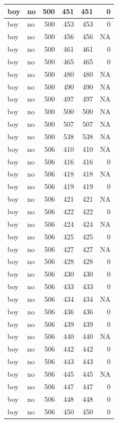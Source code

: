 \documentclass[man]{apa6}
\begin{document}
\begin{tabular}{l|l|r|r|r|r}
\hline
boy & no & 500 & 451 & 451 & 0\\
\hline
boy & no & 500 & 453 & 453 & 0\\
\hline
boy & no & 500 & 456 & 456 & NA\\
\hline
boy & no & 500 & 461 & 461 & 0\\
\hline
boy & no & 500 & 465 & 465 & 0\\
\hline
boy & no & 500 & 480 & 480 & NA\\
\hline
boy & no & 500 & 490 & 490 & NA\\
\hline
boy & no & 500 & 497 & 497 & NA\\
\hline
boy & no & 500 & 500 & 500 & NA\\
\hline
boy & no & 500 & 507 & 507 & NA\\
\hline
boy & no & 500 & 538 & 538 & NA\\
\hline
boy & no & 506 & 410 & 410 & NA\\
\hline
boy & no & 506 & 416 & 416 & 0\\
\hline
boy & no & 506 & 418 & 418 & NA\\
\hline
boy & no & 506 & 419 & 419 & 0\\
\hline
boy & no & 506 & 421 & 421 & NA\\
\hline
boy & no & 506 & 422 & 422 & 0\\
\hline
boy & no & 506 & 424 & 424 & NA\\
\hline
boy & no & 506 & 425 & 425 & 0\\
\hline
boy & no & 506 & 427 & 427 & NA\\
\hline
boy & no & 506 & 428 & 428 & 0\\
\hline
boy & no & 506 & 430 & 430 & 0\\
\hline
boy & no & 506 & 433 & 433 & 0\\
\hline
boy & no & 506 & 434 & 434 & NA\\
\hline
boy & no & 506 & 436 & 436 & 0\\
\hline
boy & no & 506 & 439 & 439 & 0\\
\hline
boy & no & 506 & 440 & 440 & NA\\
\hline
boy & no & 506 & 442 & 442 & 0\\
\hline
boy & no & 506 & 443 & 443 & 0\\
\hline
boy & no & 506 & 445 & 445 & NA\\
\hline
boy & no & 506 & 447 & 447 & 0\\
\hline
boy & no & 506 & 448 & 448 & 0\\
\hline
boy & no & 506 & 450 & 450 & 0\\

\end{tabular}
\end{document}
